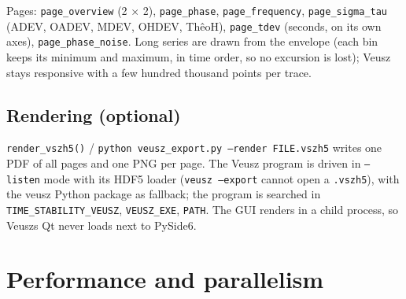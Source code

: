 \documentclass[10pt,a4paper]{article}
\begin{document}
Pages: \texttt{page\_\allowbreak{}overview} (2 × 2), \texttt{page\_\allowbreak{}phase}, \texttt{page\_\allowbreak{}frequency},
\texttt{page\_\allowbreak{}sigma\_\allowbreak{}tau} (ADEV, OADEV, MDEV, OHDEV, ThêoH), \texttt{page\_\allowbreak{}tdev} (seconds, on
its own axes), \texttt{page\_\allowbreak{}phase\_\allowbreak{}noise}. Long series are drawn from the envelope
(each bin keeps its minimum and maximum, in time order, so no excursion is
lost); Veusz stays responsive with a few hundred thousand points per trace.


\hypertarget{rendering-optional}{%
\subsection{Rendering (optional)}\label{rendering-optional}}

\texttt{render\_\allowbreak{}vszh5()} / \texttt{python veusz\_\allowbreak{}export.\allowbreak{}py --render FILE.\allowbreak{}vszh5} writes one
PDF of all pages and one PNG per page. The Veusz program is driven in
\texttt{--listen} mode with its HDF5 loader (\texttt{veusz --export} cannot open a
\texttt{.\allowbreak{}vszh5}), with the veusz Python package as fallback; the program is searched
in \texttt{TIME\_\allowbreak{}STABILITY\_\allowbreak{}VEUSZ}, \texttt{VEUSZ\_\allowbreak{}EXE}, \texttt{PATH}. The GUI renders in a child
process, so Veusz\textquotesingle s Qt never loads next to PySide6.


\hypertarget{performance-and-parallelism}{%
\section{Performance and parallelism}\label{performance-and-parallelism}}
\end{document}
